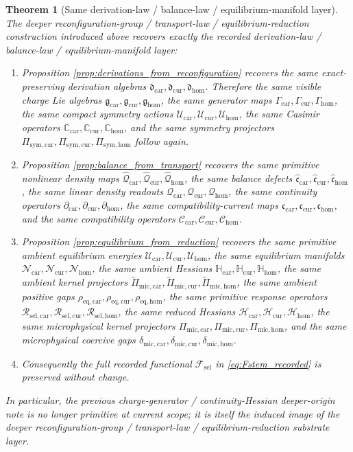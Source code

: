 \documentclass[11pt]{article}
\newcommand{\StemFunctional}{\mathscr F_{\mathrm{sel}}}
\newcommand{\UltraCarProj}{\Pi_{\mathrm{mic,car}}}
\newcommand{\UltraCurProj}{\Pi_{\mathrm{mic,cur}}}
\newcommand{\UltraHomProj}{\Pi_{\mathrm{mic,hom}}}
\newcommand{\UltraCarGap}{\delta_{\mathrm{mic,car}}}
\newcommand{\UltraCurGap}{\delta_{\mathrm{mic,cur}}}
\newcommand{\UltraHomGap}{\delta_{\mathrm{mic,hom}}}
\newcommand{\TensorSymProj}{\Pi_{\mathrm{sym,car}}}
\newcommand{\CurSymProj}{\Pi_{\mathrm{sym,cur}}}
\newcommand{\HomSymProj}{\Pi_{\mathrm{sym,hom}}}
\newcommand{\TensorCompat}{\mathcal C_{\mathrm{car}}}
\newcommand{\CurCompat}{\mathcal C_{\mathrm{cur}}}
\newcommand{\HomCompat}{\mathcal C_{\mathrm{hom}}}
\newcommand{\TensorHess}{\mathcal H_{\mathrm{car}}}
\newcommand{\CurHess}{\mathcal H_{\mathrm{cur}}}
\newcommand{\HomHess}{\mathcal H_{\mathrm{hom}}}
\newcommand{\TensorSymAct}{\mathscr U_{\mathrm{car}}}
\newcommand{\CurSymAct}{\mathscr U_{\mathrm{cur}}}
\newcommand{\HomSymAct}{\mathscr U_{\mathrm{hom}}}
\newcommand{\TensorCurrent}{\mathfrak c_{\mathrm{car}}}
\newcommand{\CurCurrent}{\mathfrak c_{\mathrm{cur}}}
\newcommand{\HomCurrent}{\mathfrak c_{\mathrm{hom}}}
\newcommand{\TensorResp}{\mathcal R_{\mathrm{sel,car}}}
\newcommand{\CurResp}{\mathcal R_{\mathrm{sel,cur}}}
\newcommand{\HomResp}{\mathcal R_{\mathrm{sel,hom}}}
\newcommand{\TensorChargeAlg}{\mathfrak g_{\mathrm{car}}}
\newcommand{\CurChargeAlg}{\mathfrak g_{\mathrm{cur}}}
\newcommand{\HomChargeAlg}{\mathfrak g_{\mathrm{hom}}}
\newcommand{\TensorGen}{\Gamma_{\mathrm{car}}}
\newcommand{\CurGen}{\Gamma_{\mathrm{cur}}}
\newcommand{\HomGen}{\Gamma_{\mathrm{hom}}}
\newcommand{\TensorCasimir}{\mathbb C_{\mathrm{car}}}
\newcommand{\CurCasimir}{\mathbb C_{\mathrm{cur}}}
\newcommand{\HomCasimir}{\mathbb C_{\mathrm{hom}}}
\newcommand{\TensorDensity}{\mathcal Q_{\mathrm{car}}}
\newcommand{\CurDensity}{\mathcal Q_{\mathrm{cur}}}
\newcommand{\HomDensity}{\mathcal Q_{\mathrm{hom}}}
\newcommand{\TensorCont}{\partial_{\mathrm{car}}}
\newcommand{\CurCont}{\partial_{\mathrm{cur}}}
\newcommand{\HomCont}{\partial_{\mathrm{hom}}}
\newcommand{\TensorAmbientHess}{\mathbb H_{\mathrm{car}}}
\newcommand{\CurAmbientHess}{\mathbb H_{\mathrm{cur}}}
\newcommand{\HomAmbientHess}{\mathbb H_{\mathrm{hom}}}
\newcommand{\TensorEqKerProj}{\widetilde\Pi_{\mathrm{mic,car}}}
\newcommand{\CurEqKerProj}{\widetilde\Pi_{\mathrm{mic,cur}}}
\newcommand{\HomEqKerProj}{\widetilde\Pi_{\mathrm{mic,hom}}}
\newcommand{\EqCarGap}{\rho_{\mathrm{eq,car}}}
\newcommand{\EqCurGap}{\rho_{\mathrm{eq,cur}}}
\newcommand{\EqHomGap}{\rho_{\mathrm{eq,hom}}}
\newcommand{\TensorDerAlg}{\mathfrak d_{\mathrm{car}}}
\newcommand{\CurDerAlg}{\mathfrak d_{\mathrm{cur}}}
\newcommand{\HomDerAlg}{\mathfrak d_{\mathrm{hom}}}
\newcommand{\TensorPrimitiveDensity}{\widehat{\mathcal Q}_{\mathrm{car}}}
\newcommand{\CurPrimitiveDensity}{\widehat{\mathcal Q}_{\mathrm{cur}}}
\newcommand{\HomPrimitiveDensity}{\widehat{\mathcal Q}_{\mathrm{hom}}}
\newcommand{\TensorBalance}{\widehat{\mathfrak c}_{\mathrm{car}}}
\newcommand{\CurBalance}{\widehat{\mathfrak c}_{\mathrm{cur}}}
\newcommand{\HomBalance}{\widehat{\mathfrak c}_{\mathrm{hom}}}
\newcommand{\TensorAmbientEnergy}{\mathcal U_{\mathrm{car}}}
\newcommand{\CurAmbientEnergy}{\mathcal U_{\mathrm{cur}}}
\newcommand{\HomAmbientEnergy}{\mathcal U_{\mathrm{hom}}}
\newcommand{\TensorEqManifold}{\mathcal N_{\mathrm{car}}}
\newcommand{\CurEqManifold}{\mathcal N_{\mathrm{cur}}}
\newcommand{\HomEqManifold}{\mathcal N_{\mathrm{hom}}}
\newtheorem{theorem}{Theorem}
\begin{document}
\begin{theorem}[Same derivation-law / balance-law / equilibrium-manifold layer]
\label{thm:same_layer}
The deeper reconfiguration-group / transport-law / equilibrium-reduction construction introduced above recovers exactly the recorded derivation-law / balance-law / equilibrium-manifold layer:
\begin{enumerate}
    \item Proposition \ref{prop:derivations_from_reconfiguration} recovers the same exact-preserving derivation algebras \(\TensorDerAlg,\CurDerAlg,\HomDerAlg\). Therefore the same visible charge Lie algebras \(\TensorChargeAlg,\CurChargeAlg,\HomChargeAlg\), the same generator maps \(\TensorGen,\CurGen,\HomGen\), the same compact symmetry actions \(\TensorSymAct,\CurSymAct,\HomSymAct\), the same Casimir operators \(\TensorCasimir,\CurCasimir,\HomCasimir\), and the same symmetry projectors \(\TensorSymProj,\CurSymProj,\HomSymProj\) follow again.
    \item Proposition \ref{prop:balance_from_transport} recovers the same primitive nonlinear density maps \(\TensorPrimitiveDensity,\CurPrimitiveDensity,\HomPrimitiveDensity\), the same balance defects \(\TensorBalance,\CurBalance,\HomBalance\), the same linear density readouts \(\TensorDensity,\CurDensity,\HomDensity\), the same continuity operators \(\TensorCont,\CurCont,\HomCont\), the same compatibility-current maps \(\TensorCurrent,\CurCurrent,\HomCurrent\), and the same compatibility operators \(\TensorCompat,\CurCompat,\HomCompat\).
    \item Proposition \ref{prop:equilibrium_from_reduction} recovers the same primitive ambient equilibrium energies \(\TensorAmbientEnergy,\CurAmbientEnergy,\HomAmbientEnergy\), the same equilibrium manifolds \(\TensorEqManifold,\CurEqManifold,\HomEqManifold\), the same ambient Hessians \(\TensorAmbientHess,\CurAmbientHess,\HomAmbientHess\), the same ambient kernel projectors \(\TensorEqKerProj,\CurEqKerProj,\HomEqKerProj\), the same ambient positive gaps \(\EqCarGap,\EqCurGap,\EqHomGap\), the same primitive response operators \(\TensorResp,\CurResp,\HomResp\), the same reduced Hessians \(\TensorHess,\CurHess,\HomHess\), the same microphysical kernel projectors \(\UltraCarProj,\UltraCurProj,\UltraHomProj\), and the same microphysical coercive gaps \(\UltraCarGap,\UltraCurGap,\UltraHomGap\).
    \item Consequently the full recorded functional \(\StemFunctional\) in \eqref{eq:Fstem_recorded} is preserved without change.
\end{enumerate}
In particular, the previous charge-generator / continuity-Hessian deeper-origin note is no longer primitive at current scope; it is itself the induced image of the deeper reconfiguration-group / transport-law / equilibrium-reduction substrate layer.
\end{theorem}
\end{document}
